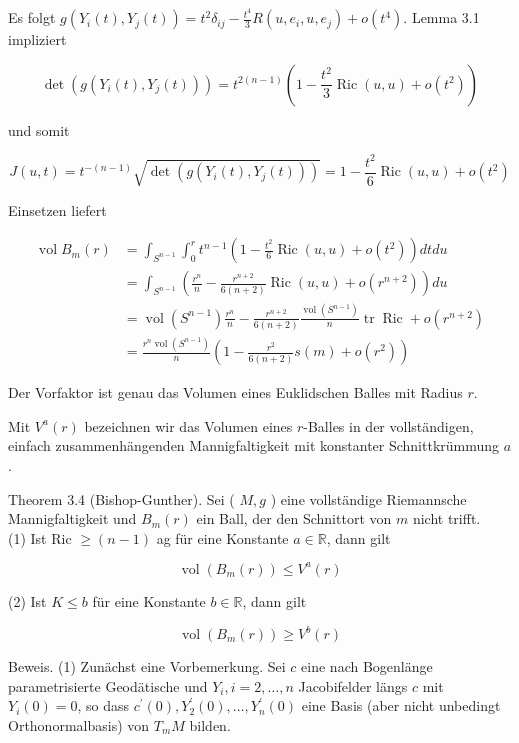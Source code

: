 \documentclass[10pt, letterpaper]{article}
\begin{document}
Es folgt $g\left(Y_{i}(t), Y_{j}(t)\right)=t^{2} \delta_{i j}-\frac{t^{4}}{3} R\left(u, e_{i}, u, e_{j}\right)+o\left(t^{4}\right)$. Lemma 3.1 impliziert

$$
\operatorname{det}\left(g\left(Y_{i}(t), Y_{j}(t)\right)\right)=t^{2(n-1)}\left(1-\frac{t^{2}}{3} \operatorname{Ric}(u, u)+o\left(t^{2}\right)\right)
$$

und somit

$$
J(u, t)=t^{-(n-1)} \sqrt{\operatorname{det}\left(g\left(Y_{i}(t), Y_{j}(t)\right)\right)}=1-\frac{t^{2}}{6} \operatorname{Ric}(u, u)+o\left(t^{2}\right)
$$

Einsetzen liefert

$$
\begin{aligned}
\operatorname{vol} B_{m}(r) & =\int_{S^{n-1}} \int_{0}^{r} t^{n-1}\left(1-\frac{t^{2}}{6} \operatorname{Ric}(u, u)+o\left(t^{2}\right)\right) d t d u \\
& =\int_{S^{n-1}}\left(\frac{r^{n}}{n}-\frac{r^{n+2}}{6(n+2)} \operatorname{Ric}(u, u)+o\left(r^{n+2}\right)\right) d u \\
& =\operatorname{vol}\left(S^{n-1}\right) \frac{r^{n}}{n}-\frac{r^{n+2}}{6(n+2)} \frac{\operatorname{vol}\left(S^{n-1}\right)}{n} \operatorname{tr} \operatorname{Ric}+o\left(r^{n+2}\right) \\
& =\frac{r^{n} \operatorname{vol}\left(S^{n-1}\right)}{n}\left(1-\frac{r^{2}}{6(n+2)} s(m)+o\left(r^{2}\right)\right)
\end{aligned}
$$

Der Vorfaktor ist genau das Volumen eines Euklidschen Balles mit Radius $r$.

Mit $V^{a}(r)$ bezeichnen wir das Volumen eines $r$-Balles in der vollständigen, einfach zusammenhängenden Mannigfaltigkeit mit konstanter Schnittkrümmung $a$.

Theorem 3.4 (Bishop-Gunther). Sei ( $M, g$ ) eine vollständige Riemannsche Mannigfaltigkeit und $B_{m}(r)$ ein Ball, der den Schnittort von $m$ nicht trifft.\\
(1) Ist Ric $\geq(n-1)$ ag für eine Konstante $a \in \mathbb{R}$, dann gilt

$$
\operatorname{vol}\left(B_{m}(r)\right) \leq V^{a}(r)
$$

(2) Ist $K \leq b$ für eine Konstante $b \in \mathbb{R}$, dann gilt

$$
\operatorname{vol}\left(B_{m}(r)\right) \geq V^{b}(r)
$$

Beweis. (1) Zunächst eine Vorbemerkung. Sei $c$ eine nach Bogenlänge parametrisierte Geodätische und $Y_{i}, i=2, \ldots, n$ Jacobifelder längs $c$ mit $Y_{i}(0)=0$, so dass $c^{\prime}(0), Y_{2}^{\prime}(0), \ldots, Y_{n}^{\prime}(0)$ eine Basis (aber nicht unbedingt Orthonormalbasis) von $T_{m} M$ bilden.
\end{document}

